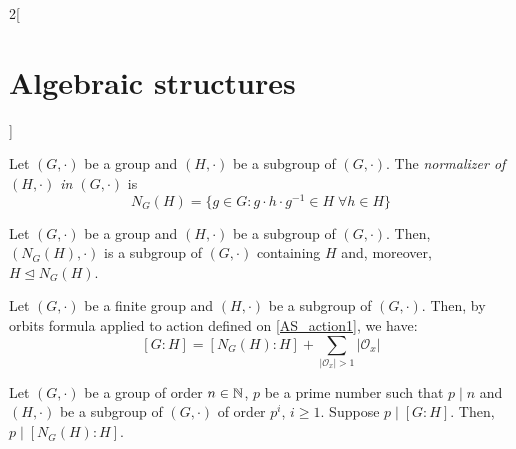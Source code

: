 \documentclass[../../../main.tex]{subfiles}
\begin{document}
\begin{multicols}{2}[\section{Algebraic structures}]
    \begin{definition}
        Let $(G,\cdot)$ be a group and $(H,\cdot)$ be a subgroup of $(G,\cdot)$. The \textit{normalizer of $(H,\cdot)$ in $(G,\cdot)$} is $$N_G(H)=\{g\in G:g\cdot h\cdot g^{-1}\in H\;\forall h\in H\}$$
    \end{definition}
    \begin{lemma}
        Let $(G,\cdot)$ be a group and $(H,\cdot)$ be a subgroup of $(G,\cdot)$. Then, $(N_G(H),\cdot)$ is a subgroup of $(G,\cdot)$ containing $H$ and, moreover, $H\unlhd N_G(H)$.
    \end{lemma}
    \begin{corollary}
        Let $(G,\cdot)$ be a finite group and $(H,\cdot)$ be a subgroup of $(G,\cdot)$. Then, by orbits formula applied to action defined on \cref{AS_action1}, we have: $$[G:H]=[N_G(H):H]+\sum_{|\mathcal{O}_x|>1}|\mathcal{O}_x|$$
    \end{corollary}
    \begin{prop}
        Let $(G,\cdot)$ be a group of order $n\in\mathbb{N} $, $p$ be a prime number such that $p\mid n$ and $(H,\cdot)$ be a subgroup of $(G,\cdot)$ of order $p^i$, $i\geq 1$. Suppose $p\mid[G:H]$. Then, $p\mid[N_G(H):H]$.
    \end{prop}

\end{multicols}
\end{document}
